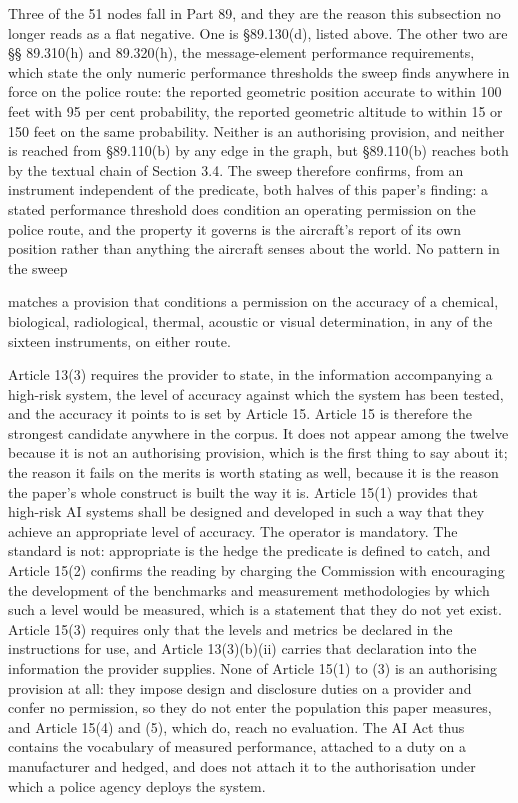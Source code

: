 Three of the 51 nodes fall in Part 89, and they are the reason this subsection no longer reads as a flat negative. One is \S{}89.130(d), listed above. The other two are \S{}\S{} 89.310(h) and 89.320(h), the message-element performance requirements, which state the only numeric performance thresholds the sweep finds anywhere in force on the police route: the reported geometric position accurate to within 100 feet with 95 per cent probability, the reported geometric altitude to within 15 or 150 feet on the same probability. Neither is an authorising provision, and neither is reached from \S{}89.110(b) by any edge in the graph, but \S{}89.110(b) reaches both by the textual chain of Section 3.4. The sweep therefore confirms, from an instrument independent of the predicate, both halves of this paper's finding: a stated performance threshold does condition an operating permission on the police route, and the property it governs is the aircraft's report of its own position rather than anything the aircraft senses about the world. No pattern in the sweep

matches a provision that conditions a permission on the accuracy of a chemical, biological, radiological, thermal, acoustic or visual determination, in any of the sixteen instruments, on either route.

Article 13(3) requires the provider to state, in the information accompanying a high-risk system, the level of accuracy against which the system has been tested, and the accuracy it points to is set by Article 15. Article 15 is therefore the strongest candidate anywhere in the corpus. It does not appear among the twelve because it is not an authorising provision, which is the first thing to say about it; the reason it fails on the merits is worth stating as well, because it is the reason the paper's whole construct is built the way it is. Article 15(1) provides that high-risk AI systems shall be designed and developed in such a way that they achieve an appropriate level of accuracy. The operator is mandatory. The standard is not: appropriate is the hedge the predicate is defined to catch, and Article 15(2) confirms the reading by charging the Commission with encouraging the development of the benchmarks and measurement methodologies by which such a level would be measured, which is a statement that they do not yet exist. Article 15(3) requires only that the levels and metrics be declared in the instructions for use, and Article 13(3)(b)(ii) carries that declaration into the information the provider supplies. None of Article 15(1) to (3) is an authorising provision at all: they impose design and disclosure duties on a provider and confer no permission, so they do not enter the population this paper measures, and Article 15(4) and (5), which do, reach no evaluation. The AI Act thus contains the vocabulary of measured performance, attached to a duty on a manufacturer and hedged, and does not attach it to the authorisation under which a police agency deploys the system.


